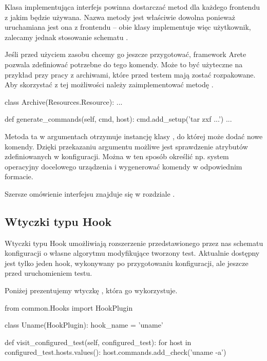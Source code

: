 \documentclass[00-praca-magisterska.tex]{subfiles}
\begin{document}
Klasa implementująca interfejs  powinna dostarczać metod
 dla każdego frontendu z jakim będzie używana. Nazwa
metody jest właściwie dowolna ponieważ uruchamiana jest ona z frontendu -- obie
klasy implementuje więc użytkownik, zalecamy jednak stosowanie schematu
.

Jeśli przed użyciem zasobu chcemy go jeszcze przygotować, framework Arete
pozwala zdefiniować potrzebne do tego komendy. Może to być użyteczne na
przykład przy pracy z archiwami, które przed testem mają zostać rozpakowane. Aby
skorzystać z tej możliwości należy zaimplementować metodę
.

\begin{pythoncode}
  class Archive(Resources.Resource):
      ...

      def generate_commands(self, cmd, host):
          cmd.add_setup('tar zxf ...')
	  ...
\end{pythoncode}

Metoda ta w argumentach otrzymuje instancję klasy , do której
może dodać nowe komendy. Dzięki przekazaniu argumentu  możliwe jest
sprawdzenie atrybutów zdefiniowanych w konfiguracji. Można w ten sposób
określić np. system operacyjny docelowego urządzenia i wygenerować komendy w
odpowiednim formacie.

Szersze omówienie interfejsu  znajduje się w rozdziale
.

\subsection{Wtyczki typu Hook}

Wtyczki typu Hook umożliwiają rozszerzenie przedstawionego przez nas schematu
konfiguracji o własne algorytmu modyfikujące tworzony test. Aktualnie dostępny
jest tylko jeden hook, wykonywany po przygotowaniu konfiguracji, ale jeszcze
przed uruchomieniem testu.

Poniżej prezentujemy wtyczkę , która go wykorzystuje.

\begin{pythoncode}
  from common.Hooks import HookPlugin
  
  class Uname(HookPlugin):
      hook_name = 'uname'
  
      def visit_configured_test(self, configured_test):
          for host in configured_test.hosts.values():
              host.commands.add_check('uname -a')
\end{pythoncode}
\end{document}
